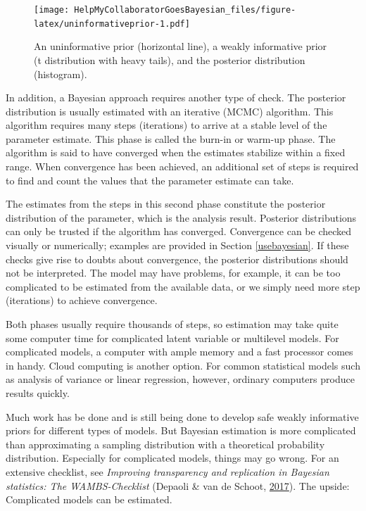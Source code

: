 \documentclass[
  english,
  doc]{apa6}
\begin{document}
\begin{figure}
\centering
\texttt{[image: HelpMyCollaboratorGoesBayesian\_files/figure-latex/uninformativeprior-1.pdf]}
\caption{\label{fig:uninformativeprior}An uninformative prior (horizontal line), a weakly informative prior (t distribution with heavy tails), and the posterior distribution (histogram).}
\end{figure}

In addition, a Bayesian approach requires another type of check. The posterior distribution is usually estimated with an iterative (MCMC) algorithm. This algorithm requires many steps (iterations) to arrive at a stable level of the parameter estimate. This phase is called the burn-in or warm-up phase. The algorithm is said to have converged when the estimates stabilize within a fixed range. When convergence has been achieved, an additional set of steps is required to find and count the values that the parameter estimate can take.

The estimates from the steps in this second phase constitute the posterior distribution of the parameter, which is the analysis result. Posterior distributions can only be trusted if the algorithm has converged. Convergence can be checked visually or numerically; examples are provided in Section \ref{usebayesian}. If these checks give rise to doubts about convergence, the posterior distributions should not be interpreted. The model may have problems, for example, it can be too complicated to be estimated from the available data, or we simply need more step (iterations) to achieve convergence.

Both phases usually require thousands of steps, so estimation may take quite some computer time for complicated latent variable or multilevel models. For complicated models, a computer with ample memory and a fast processor comes in handy. Cloud computing is another option. For common statistical models such as analysis of variance or linear regression, however, ordinary computers produce results quickly.

Much work has be done and is still being done to develop safe weakly informative priors for different types of models. But Bayesian estimation is more complicated than approximating a sampling distribution with a theoretical probability distribution. Especially for complicated models, things may go wrong. For an extensive checklist, see \emph{Improving transparency and replication in Bayesian statistics: The WAMBS-Checklist} (Depaoli \& van de Schoot, \protect\hyperlink{ref-depaoliImprovingTransparencyReplication2017}{2017}). The upside: Complicated models can be estimated.
\end{document}
